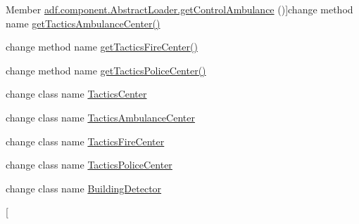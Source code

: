 \begin{DoxyRefList}
\hypertarget{deprecated__deprecated000006}{}%
Member \hyperlink{classadf_1_1component_1_1AbstractLoader_a2044c317869b16349d4fdbf7d5d50dcd}{adf.component.Abstract\+Loader.get\+Control\+Ambulance} ()]change method name \hyperlink{}{get\+Tactics\+Ambulance\+Center()}  
\item[\label{deprecated__deprecated000007}%
\hypertarget{deprecated__deprecated000007}{}%
Member \hyperlink{classadf_1_1component_1_1AbstractLoader_a66e4649d775d291dda3e5b977596bccf}{adf.component.Abstract\+Loader.get\+Control\+Fire} ()]change method name \hyperlink{}{get\+Tactics\+Fire\+Center()}  
\item[\label{deprecated__deprecated000008}%
\hypertarget{deprecated__deprecated000008}{}%
Member \hyperlink{classadf_1_1component_1_1AbstractLoader_a2917adfedf677a3af006521e64996a42}{adf.component.Abstract\+Loader.get\+Control\+Police} ()]change method name \hyperlink{}{get\+Tactics\+Police\+Center()}  
\item[\label{deprecated__deprecated000009}%
\hypertarget{deprecated__deprecated000009}{}%
Class \hyperlink{classadf_1_1component_1_1control_1_1Control}{adf.component.control.Control} ]change class name \hyperlink{}{Tactics\+Center}  
\item[\label{deprecated__deprecated000010}%
\hypertarget{deprecated__deprecated000010}{}%
Class \hyperlink{classadf_1_1component_1_1control_1_1ControlAmbulance}{adf.component.control.Control\+Ambulance} ]change class name \hyperlink{}{Tactics\+Ambulance\+Center}  
\item[\label{deprecated__deprecated000011}%
\hypertarget{deprecated__deprecated000011}{}%
Class \hyperlink{classadf_1_1component_1_1control_1_1ControlFire}{adf.component.control.Control\+Fire} ]change class name \hyperlink{}{Tactics\+Fire\+Center}  
\item[\label{deprecated__deprecated000012}%
\hypertarget{deprecated__deprecated000012}{}%
Class \hyperlink{classadf_1_1component_1_1control_1_1ControlPolice}{adf.component.control.Control\+Police} ]change class name \hyperlink{}{Tactics\+Police\+Center}  
\item[\label{deprecated__deprecated000013}%
\hypertarget{deprecated__deprecated000013}{}%
Class \hyperlink{classadf_1_1component_1_1module_1_1complex_1_1BuildingSelector}{adf.component.module.complex.Building\+Selector} ]change class name \hyperlink{classadf_1_1component_1_1module_1_1complex_1_1BuildingDetector}{Building\+Detector}  
\item[\label{deprecated__deprecated000014}%
\hypertarget{deprecated__deprecated000014}{}%

\end{DoxyRefList}
